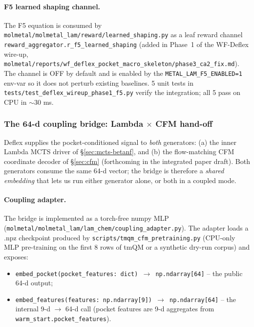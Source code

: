 \paragraph{F5 learned shaping channel.}
The F5 equation is consumed by
\texttt{molmetal/molmetal\_lam/reward/learned\_shaping.py}
as a leaf reward channel
\texttt{reward\_aggregator.r\_f5\_learned\_shaping} (added in
Phase~1 of the WF-Deflex wire-up,
\texttt{molmetal/reports/wf\_deflex\_pocket\_macro\_skeleton/phase3\_ca2\_fix.md}).
The channel is OFF by default and is enabled by the
\texttt{METAL\_LAM\_F5\_ENABLED=1} env-var so it does not perturb
existing baselines.  5 unit tests in
\texttt{tests/test\_deflex\_wireup\_phase1\_f5.py} verify the
integration; all 5 pass on CPU in $\sim$30 ms.

\subsubsection{The 64-d coupling bridge: Lambda $\times$ CFM hand-off}
\label{sec:deflex-bridge}

Deflex supplies the pocket-conditioned signal to \emph{both}
generators: (a) the inner Lambda MCTS driver of \S\ref{sec:mcts-betanf},
and (b) the flow-matching CFM coordinate decoder of §\ref{sec:cfm}
(forthcoming in the integrated paper draft).  Both generators
consume the same 64-d vector; the bridge is therefore a
\emph{shared embedding} that lets us run either generator alone,
or both in a coupled mode.

\paragraph{Coupling adapter.}
The bridge is implemented as a torch-free numpy MLP
(\texttt{molmetal/molmetal\_lam/lam\_chem/coupling\_adapter.py}).
The adapter loads a .npz checkpoint produced by
\texttt{scripts/tmqm\_cfm\_pretraining.py} (CPU-only MLP
pre-training on the first 8 rows of tmQM or a synthetic
dry-run corpus) and exposes:

\begin{itemize}
  \item \texttt{embed\_pocket(pocket\_features: dict) $\to$ np.ndarray[64]} --
        the public 64-d output;
  \item \texttt{embed\_features(features: np.ndarray[9]) $\to$ np.ndarray[64]} --
        the internal 9-d $\to$ 64-d call (pocket features are 9-d
        aggregates from \texttt{warm\_start.pocket\_features}).
\end{itemize}

